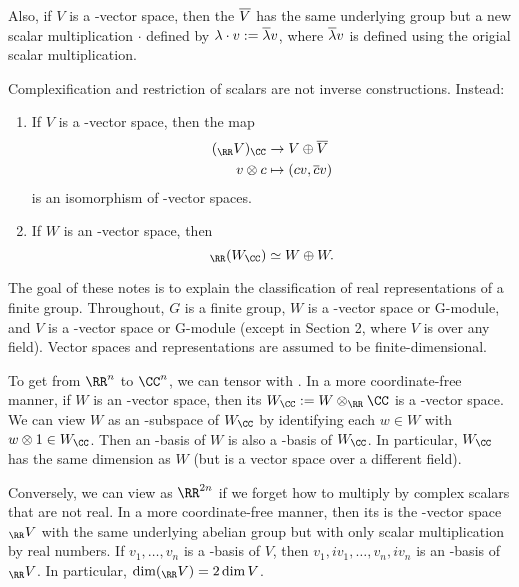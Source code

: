 \documentclass{scrartcl}
\begin{document}
Also, if $V$ is a \CC-vector space, then the  $\overline{V}$ has the same underlying group but a new scalar multiplication $\cdot$ defined by $\lambda\cdot v := \overline{\lambda}v$, where $\overline{\lambda}v$ is defined using the origial scalar multiplication.

Complexification and restriction of scalars are not inverse constructions. Instead:
\begin{proposition}
    \hfill
    \begin{enumerate}[font=\normalfont]
        \item If $V$ is a \CC-vector space, then the map \begin{align*}
            (_{\RR} V)_{\CC} &\rightarrow V \oplus \ol{V} \\
            v\otimes c &\mapsto (cv,\ol{c}v) \\
        \end{align*} is an isomorphism of \CC-vector spaces.
        \item If $W$ is an \RR-vector space, then \[_{\RR}(W_{\CC}) \simeq W\oplus W.\]
    \end{enumerate}
\end{proposition}



The goal of these notes is to explain the classification of real representations of a finite
group. Throughout, $G$ is a finite group, $W$ is a \RR-vector space or \RR G-module, and $V$ is a
\CC-vector space or \CC G-module (except in Section 2, where $V$ is over any field). Vector spaces
and representations are assumed to be finite-dimensional.

To get from $\RR^n$ to $\CC^n$, we can tensor with \CC. In a more coordinate-free
manner, if $W$ is an \RR-vector space, then its  $W_{\CC} := W \otimes_{\RR} \CC$ is a \CC-vector
space. We can view $W$ as an \RR-subspace of $W_{\CC}$ by identifying each $w \in W$ with $w \otimes 1 \in W_{\CC}$.
Then an \RR-basis of $W$ is also a \CC-basis of $W_{\CC}$. In particular, $W_{\CC}$ has the same dimension as
$W$ (but is a vector space over a different field).

Conversely, we can view \CC[n] as $\RR^{2n}$ if we forget how to multiply by complex scalars that are not real. In a more coordinate-free manner, then its  is the \RR-vector space $_{\RR} V$ with the same underlying abelian group but with only scalar multiplication by real numbers. If $v_1,\dots,v_n$ is a \CC-basis of $V$, then $v_1, iv_1,\dots,v_n,iv_n$ is an \RR-basis of $_{\RR} V$. In particular, $\dim(_{\RR} V) = 2\dim V$.
\end{document}
